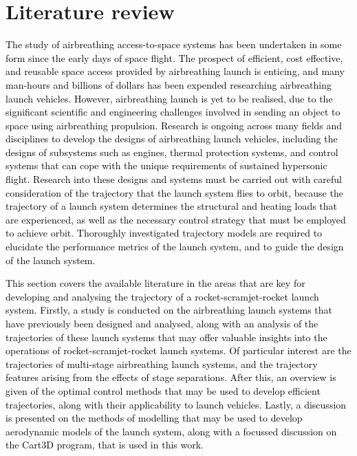 
\cleardoublepage
\chapter{Literature review}\label{chapter:literature-review}

	
  \textcolor{black}{
  The study of airbreathing access-to-space systems has been undertaken in some form since the early days of space flight. The prospect of efficient, cost effective, and reusable space access provided by airbreathing launch is enticing, and many man-hours and billions of dollars has been expended researching airbreathing launch vehicles. However, airbreathing launch is yet to be realised, due to the significant scientific and engineering challenges involved in sending an object to space using airbreathing propulsion. Research is ongoing across many fields and disciplines to develop the designs of airbreathing launch vehicles, including the designs of subsystems such as engines, thermal protection systems, and control systems that can cope with the unique requirements of sustained hypersonic flight. }
\textcolor{black}{Research into these designs and systems must be carried out with careful consideration of the trajectory that the launch system flies to orbit, because the trajectory of a launch system determines the structural and heating loads that are experienced, as well as the necessary control strategy that must be employed to achieve orbit. Thoroughly investigated trajectory models are required to elucidate the performance metrics of the launch system, and to guide the design of the launch system.
}



\textcolor{black}{
This section covers the available literature in the areas that are key for developing and analysing the trajectory of a rocket-scramjet-rocket launch system. 
Firstly, a study is conducted on the airbreathing launch systems that have previously been designed and analysed, along with an analysis of the trajectories of these launch systems that may offer valuable insights into the operations of rocket-scramjet-rocket launch systems. Of particular interest are the trajectories of multi-stage airbreathing launch systems, and the trajectory features arising from the effects of stage separations. 
After this, an overview is given of the optimal control methods that may be used to develop efficient trajectories, along with their applicability to launch vehicles. 
Lastly, a discussion is presented on the methods of modelling that may be used to develop aerodynamic models of the launch system, along with a focussed discussion on the Cart3D program, that is used in this work. 
}

